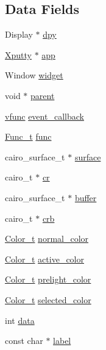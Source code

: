 \subsection*{Data Fields}
\begin{DoxyCompactItemize}
\item 
Display $\ast$ \hyperlink{structWidget__t_a5ae8f0fdd24c6baf15173dc0cc9ae360}{dpy}
\item 
\hyperlink{structXputty}{Xputty} $\ast$ \hyperlink{structWidget__t_a06eaa5b134c47983fd965e745cdbaa3b}{app}
\item 
Window \hyperlink{structWidget__t_acb2bfb41674371ee1220a9d6a2d89fb1}{widget}
\item 
void $\ast$ \hyperlink{structWidget__t_a483f6517c19fe09e1bf2eaec6646a14b}{parent}
\item 
\hyperlink{xwidget_8h_a6423c133fb634585762a77dda34befab}{vfunc} \hyperlink{structWidget__t_af0adf855c1991d11f59c5b6f9a2c526a}{event\+\_\+callback}
\item 
\hyperlink{structFunc__t}{Func\+\_\+t} \hyperlink{structWidget__t_a225b9a175e132994a5aa73b59a2911ad}{func}
\item 
cairo\+\_\+surface\+\_\+t $\ast$ \hyperlink{structWidget__t_ae9b5979742ea31817ff7d7b34a56f88d}{surface}
\item 
cairo\+\_\+t $\ast$ \hyperlink{structWidget__t_a26594f6ffabe98fc08f9207150fc9417}{cr}
\item 
cairo\+\_\+surface\+\_\+t $\ast$ \hyperlink{structWidget__t_a84d225e7b261d67daa764b47c8c62107}{buffer}
\item 
cairo\+\_\+t $\ast$ \hyperlink{structWidget__t_ad98022ee160d4c0906110868fc9e5664}{crb}
\item 
\hyperlink{structColor__t}{Color\+\_\+t} \hyperlink{structWidget__t_a24f7c236de2f1083b37318d0552c8e3a}{normal\+\_\+color}
\item 
\hyperlink{structColor__t}{Color\+\_\+t} \hyperlink{structWidget__t_a9b835922783ab3d2243ed19582773f97}{active\+\_\+color}
\item 
\hyperlink{structColor__t}{Color\+\_\+t} \hyperlink{structWidget__t_a58cb10635bfd905d2d361b492b7c6565}{prelight\+\_\+color}
\item 
\hyperlink{structColor__t}{Color\+\_\+t} \hyperlink{structWidget__t_ae473f4da8e3178696dc7261ca2147179}{selected\+\_\+color}
\item 
int \hyperlink{structWidget__t_a9dd7b58be77bf31ab021aa627a73186a}{data}
\item 
const char $\ast$ \hyperlink{structWidget__t_a952020107ac1f6d9a37b4f978f77b61c}{label}

\end{DoxyCompactItemize}
